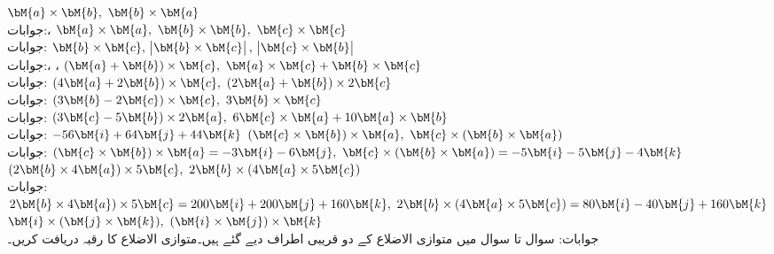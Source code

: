 \quad
$\bM{a}\times \bM{b},\,\, \bM{b}\times \bM{a}$\\
جوابات:، 
\quad
$\bM{a}\times \bM{a},\,\, \bM{b}\times \bM{b},\,\, \bM{c}\times \bM{c}$\\
جوابات:
\quad
$\bM{b}\times \bM{c},\,\, \abs{\bM{b}\times \bM{c}},\,\, \abs{\bM{c}\times \bM{b}}$\\
جوابات:، ،  
\quad
$(\bM{a}+\bM{b})\times \bM{c},\,\, \bM{a}\times \bM{c}+\bM{b}\times \bM{c}$\\
جوابات:
\quad
$(4\bM{a}+2\bM{b})\times \bM{c},\,\, (2\bM{a}+\bM{b})\times 2\bM{c}$\\
جوابات:
\quad
$(3\bM{b}-2\bM{c})\times \bM{c},\,\, 3\bM{b}\times \bM{c}$\\
جوابات:
\quad
$(3\bM{c}-5\bM{b})\times 2\bM{a},\,\, 6\bM{c}\times \bM{a}+10\bM{a}\times \bM{b}$\\
جوابات:
$-56\bM{i}+64\bM{j}+44\bM{k}$
\quad
$(\bM{c}\times \bM{b})\times \bM{a},\,\, \bM{c}\times (\bM{b}\times \bM{a})$\\
جوابات:
$(\bM{c}\times \bM{b})\times \bM{a}=-3\bM{i}-6\bM{j},\,\, \bM{c}\times (\bM{b}\times \bM{a})=-5\bM{i}-5\bM{j}-4\bM{k}$
\quad
$(2\bM{b}\times 4\bM{a})\times 5\bM{c},\,\, 2\bM{b}\times (4\bM{a}\times 5\bM{c})$\\
جوابات:
$2\bM{b}\times 4\bM{a})\times 5\bM{c}=200\bM{i}+200\bM{j}+160\bM{k},\,\, 2\bM{b}\times (4\bM{a}\times 5\bM{c})=80\bM{i}-40\bM{j}+160\bM{k}$
\quad
$\bM{i}\times(\bM{j}\times \bM{k}),\,\, (\bM{i}\times \bM{j})\times \bM{k}$\\
جوابات:
سوال  تا سوال  میں متوازی الاضلاع کے دو قریبی اطراف دیے گئے ہیں۔متوازی الاضلاع کا رقبہ دریافت کریں۔

